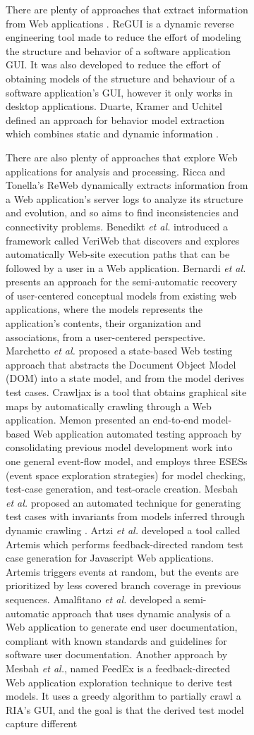 \documentclass[conference]{IEEEtran}
\begin{document}
\begin{enumerate}
\begin{figure}[!htb]
\begin{itemize}
\begin{figure}[!htb]
\begin{itemize}
There are plenty of approaches that extract information from Web applications \cite{sampath2007applying,amalfitano2010rich, andjelkovic2011trace,5556690,conf/fmics/PaivaFM07}. ReGUI \cite{coimbra2011reverse,coimbra2012dynamic} is a dynamic reverse engineering tool made to reduce the effort of modeling the structure and behavior of a software application GUI. It was also developed to reduce the effort of obtaining models of the structure and behaviour of a software application's GUI, however it only works in desktop applications.
Duarte, Kramer and Uchitel defined an approach for behavior model extraction which combines static and dynamic information \cite{duarte2006model}.

There are also plenty of approaches that explore Web applications for analysis and processing. Ricca and Tonella's ReWeb \cite{ricca2001understanding} dynamically extracts information from a Web application's server logs to analyze its structure and evolution, and so aims to find inconsistencies and connectivity problems. Benedikt \textit{et al.} introduced a framework called VeriWeb \cite{benedikt2002veriWeb} that discovers and explores automatically Web-site execution paths that can be followed by a user in a Web application. Bernardi \textit{et al.} \cite{bernardi2008reverse} presents an approach for the semi-automatic recovery of user-centered conceptual models from existing web applications, where the models represents the application's contents, their organization and associations, from a user-centered perspective. Marchetto \textit{et al.} proposed a state-based Web testing approach \cite{marchetto2008state} that abstracts the Document Object Model (DOM) into a state model, and from the model derives test cases. Crawljax \cite{roest2010automated} is a tool that obtains graphical site maps by automatically crawling through a Web application. Memon presented an end-to-end model-based Web application automated testing approach \cite{memon2007event} by consolidating previous model development work into one general event-flow model, and employs three ESESs (event space exploration strategies) for model checking, test-case generation, and test-oracle creation. Mesbah \textit{et al.} proposed an automated technique for generating test cases with invariants from models inferred through dynamic crawling \cite{mesbah2012invariant}. Artzi \textit{et al.} developed a tool called Artemis \cite{artzi2011framework} which performs feedback-directed random test case generation for Javascript Web applications. Artemis triggers events at random, but the events are prioritized by less covered branch coverage in previous sequences. Amalfitano \textit{et al.} developed a semi-automatic approach \cite{amalfitano2011using} that uses dynamic analysis of a Web application to generate end user documentation, compliant with known standards and guidelines for software user documentation. Another approach by Mesbah \textit{et al.}, named FeedEx \cite{fard2013feedback} is a feedback-directed Web application exploration technique to derive test models. It uses a greedy algorithm to partially crawl a RIA's GUI, and the goal is that the derived test model capture different 
\end{itemize}
\end{figure}
\end{itemize}
\end{figure}
\end{enumerate}
\end{document}
